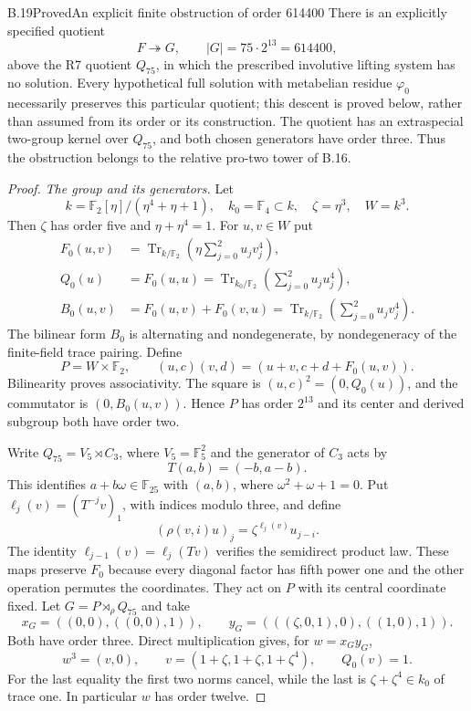 \begin{statement}{B.19}{Proved}{An explicit finite obstruction of order 614400}
There is an explicitly specified quotient
\[
                F\twoheadrightarrow G,
                \qquad |G|=75\cdot2^{13}=614400,
\]
above the R7 quotient $Q_{75}$, in which the prescribed
involutive lifting system has no solution. Every hypothetical full
solution with metabelian residue $\varphi_0$ necessarily preserves
this particular quotient; this descent is proved below, rather
than assumed from its order or its construction.
The quotient has an extraspecial two-group kernel over $Q_{75}$,
and both chosen generators have order three. Thus the obstruction
belongs to the relative pro-two tower of B.16.
\end{statement}
\begin{proof}
\emph{The group and its generators.}
Let
\[
 k=\mathbb F_2[\eta]/(\eta^4+\eta+1),\quad
 k_0=\mathbb F_4\subset k,
 \quad \zeta=\eta^3,
 \quad W=k^3.
\]
Then $\zeta$ has order five and $\eta+\eta^4=1$.
For $u,v\in W$ put
\[
\begin{split}
 F_0(u,v)&=\operatorname{Tr}_{k/\mathbb F_2}
                       \left(\eta\sum_{j=0}^2u_jv_j^4\right),\\
 Q_0(u)&=F_0(u,u)
        =\operatorname{Tr}_{k_0/\mathbb F_2}
                       \left(\sum_{j=0}^2u_ju_j^4\right),\\
 B_0(u,v)&=F_0(u,v)+F_0(v,u)
        =\operatorname{Tr}_{k/\mathbb F_2}
                       \left(\sum_{j=0}^2u_jv_j^4\right).
\end{split}
\]
The bilinear form $B_0$ is alternating and nondegenerate, by
nondegeneracy of the finite-field trace pairing. Define
\[
 P=W\times\mathbb F_2,
 \qquad (u,c)(v,d)=(u+v,c+d+F_0(u,v)).
 \tag{B.19.1}
\]
Bilinearity proves associativity. The square is
$(u,c)^2=(0,Q_0(u))$, and the commutator is
$(0,B_0(u,v))$. Hence $P$ has order $2^{13}$ and its center
and derived subgroup both have order two.

Write $Q_{75}=V_5\rtimes C_3$, where $V_5=\mathbb F_5^2$ and
the generator of $C_3$ acts by
\[
       T(a,b)=(-b,a-b).
\]
This identifies $a+b\omega\in\mathbb F_{25}$ with $(a,b)$,
where $\omega^2+\omega+1=0$. Put
$\ell_j(v)=(T^{-j}v)_1$, with indices modulo three, and define
\[
       (\rho(v,i)u)_j
            =\zeta^{\ell_j(v)}u_{j-i}.
 \tag{B.19.2}
\]
The identity $\ell_{j-1}(v)=\ell_j(Tv)$ verifies the semidirect
product law. These maps preserve $F_0$ because every diagonal
factor has fifth power one and the other operation permutes the
coordinates. They act on $P$ with its central coordinate fixed.
Let $G=P\rtimes_\rho Q_{75}$ and take
\[
 x_G=((0,0),((0,0),1)),\qquad
 y_G=(((\zeta,0,1),0),((1,0),1)).
 \tag{B.19.3}
\]
Both have order three. Direct multiplication gives, for $w=x_Gy_G$,
\[
 w^3=(v,0),\qquad
 v=(1+\zeta,1+\zeta,1+\zeta^4),\qquad Q_0(v)=1.
 \tag{B.19.4}
\]
For the last equality the first two norms cancel, while the last
is $\zeta+\zeta^4\in k_0$ of trace one. In particular $w$ has
order twelve.


\end{proof}
